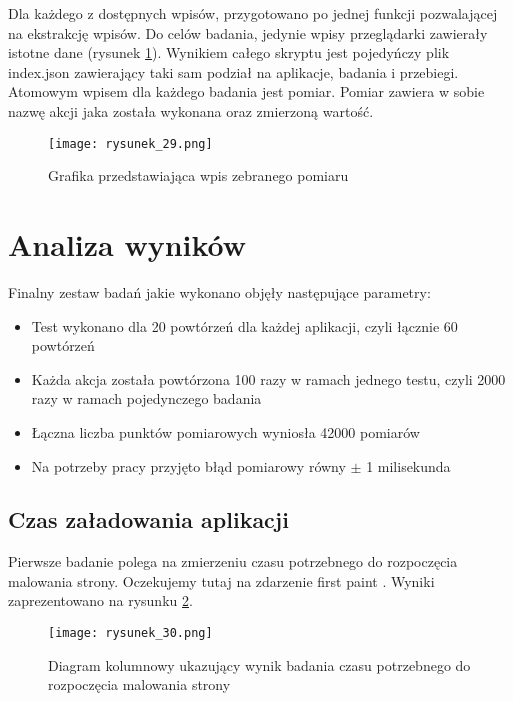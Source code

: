 Dla każdego z dostępnych wpisów, przygotowano po jednej funkcji pozwalającej na ekstrakcję wpisów.
Do celów badania, jedynie wpisy przeglądarki zawierały istotne dane (rysunek \ref{fig:rysunek_29}).
Wynikiem całego skryptu jest pojedyńczy plik index.json zawierający taki sam podział na aplikacje, badania i przebiegi.
Atomowym wpisem dla każdego badania jest pomiar. Pomiar zawiera w sobie nazwę akcji jaka została wykonana oraz zmierzoną wartość.

\begin{figure}[htbp]
    \centering
    \texttt{[image: rysunek\_29.png]}
    \caption{Grafika przedstawiająca wpis zebranego pomiaru}
    \label{fig:rysunek_29}
\end{figure}

\clearpage
\section{Analiza wyników}

Finalny zestaw badań jakie wykonano objęły następujące parametry:
\begin{itemize}
    \item Test wykonano dla 20 powtórzeń dla każdej aplikacji, czyli łącznie 60 powtórzeń
    \item Każda akcja została powtórzona 100 razy w ramach jednego testu, czyli 2000 razy w ramach pojedynczego badania
    \item Łączna liczba punktów pomiarowych wyniosła 42000 pomiarów
    \item Na potrzeby pracy przyjęto błąd pomiarowy równy $\pm$ 1 milisekunda
\end{itemize}

\subsection{Czas załadowania aplikacji}

Pierwsze badanie polega na zmierzeniu czasu potrzebnego do rozpoczęcia malowania strony. Oczekujemy tutaj na zdarzenie first paint \cite{mdn-first-paint}.
Wyniki zaprezentowano na rysunku \ref{fig:rysunek_30}.

\begin{figure}[htbp]
    \centering
    \texttt{[image: rysunek\_30.png]}
    \caption{Diagram kolumnowy ukazujący wynik badania czasu potrzebnego do rozpoczęcia malowania strony}
    \label{fig:rysunek_30}
\end{figure}

